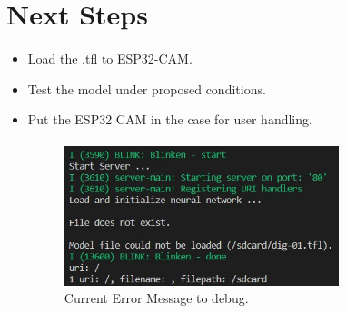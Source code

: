 \section{Next Steps}

\STANDARD{\insertsection}
{ 
	\framesubtitle{\insertsubsection}
\begin{itemize}
	\item Load the .tfl to ESP32-CAM.
	\item Test the model under proposed conditions. 
	\item Put the ESP32 CAM in the case for user handling.
	
		\framesubtitle{\insertsubsection}
	\begin{figure}  [!h]
		\begin{center}
			\includegraphics[width=8cm]{images/Error_tfl.jpg}
			\caption{Current Error Message to debug.}
		\end{center}
	\end{figure}
	
\end{itemize}
	
}